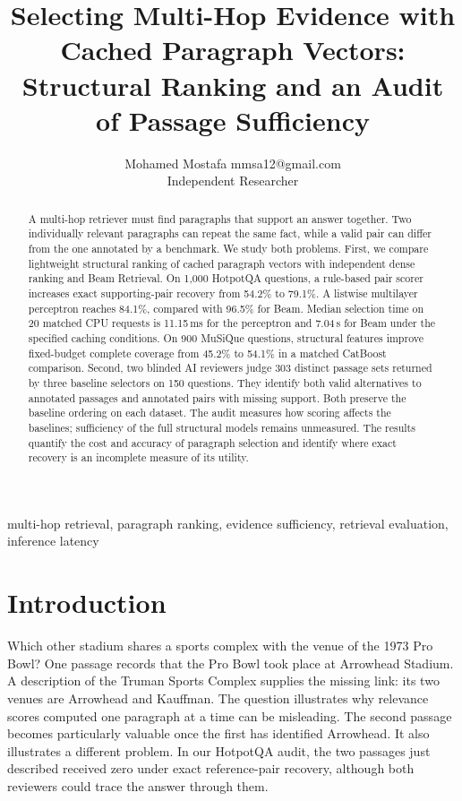 \documentclass[twoside,a4paper,11pt]{article}
\begin{document}
\title{Selecting Multi-Hop Evidence with Cached Paragraph Vectors: Structural Ranking and an Audit of Passage Sufficiency}
\author{\name Mohamed Mostafa \email mmsa12@gmail.com \\
\addr Independent Researcher}
\maketitle

\begin{abstract}%
A multi-hop retriever must find paragraphs that support an answer together. Two individually relevant paragraphs can repeat the same fact, while a valid pair can differ from the one annotated by a benchmark. We study both problems. First, we compare lightweight structural ranking of cached paragraph vectors with independent dense ranking and Beam Retrieval. On 1,000 HotpotQA questions, a rule-based pair scorer increases exact supporting-pair recovery from 54.2\% to 79.1\%. A listwise multilayer perceptron reaches 84.1\%, compared with 96.5\% for Beam. Median selection time on 20 matched CPU requests is 11.15\,ms for the perceptron and 7.04\,s for Beam under the specified caching conditions. On 900 MuSiQue questions, structural features improve fixed-budget complete coverage from 45.2\% to 54.1\% in a matched CatBoost comparison. Second, two blinded AI reviewers judge 303 distinct passage sets returned by three baseline selectors on 150 questions. They identify both valid alternatives to annotated passages and annotated pairs with missing support. Both preserve the baseline ordering on each dataset. The audit measures how scoring affects the baselines; sufficiency of the full structural models remains unmeasured. The results quantify the cost and accuracy of paragraph selection and identify where exact recovery is an incomplete measure of its utility.
\end{abstract}
\begin{keywords}
multi-hop retrieval, paragraph ranking, evidence sufficiency, retrieval evaluation, inference latency
\end{keywords}

\section{Introduction}
Which other stadium shares a sports complex with the venue of the 1973 Pro Bowl? One passage records that the Pro Bowl took place at Arrowhead Stadium. A description of the Truman Sports Complex supplies the missing link: its two venues are Arrowhead and Kauffman. The question illustrates why relevance scores computed one paragraph at a time can be misleading. The second passage becomes particularly valuable once the first has identified Arrowhead. It also illustrates a different problem. In our HotpotQA audit, the two passages just described received zero under exact reference-pair recovery, although both reviewers could trace the answer through them.
\end{document}
